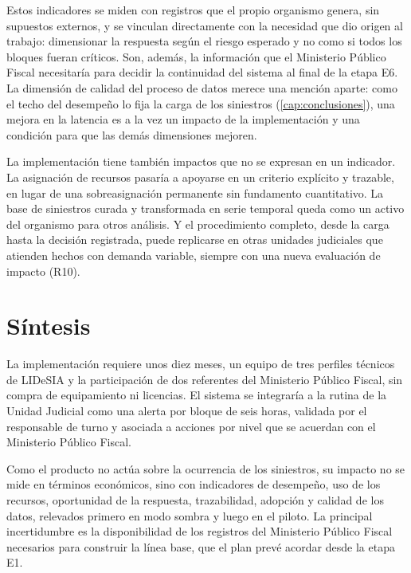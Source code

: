 Estos indicadores se miden con registros que el propio organismo genera, sin supuestos
externos, y se vinculan directamente con la necesidad que dio origen al trabajo:
dimensionar la respuesta según el riesgo esperado y no como si todos los bloques fueran
críticos. Son, además, la información que el Ministerio Público Fiscal necesitaría para
decidir la continuidad del sistema al final de la etapa E6. La dimensión de calidad del
proceso de datos merece una mención aparte: como el techo del desempeño lo fija la carga
de los siniestros (\cref{cap:conclusiones}), una mejora en la latencia es a la vez un
impacto de la implementación y una condición para que las demás dimensiones mejoren.

La implementación tiene también impactos que no se expresan en un indicador. La
asignación de recursos pasaría a apoyarse en un criterio explícito y trazable, en lugar
de una sobreasignación permanente sin fundamento cuantitativo. La base de siniestros
curada y transformada en serie temporal queda como un activo del organismo para otros
análisis. Y el procedimiento completo, desde la carga hasta la decisión registrada, puede
replicarse en otras unidades judiciales que atienden hechos con demanda variable,
siempre con una nueva evaluación de impacto (R10).

\section{Síntesis}\label{sec:impl-sintesis}

La implementación requiere unos diez meses, un equipo de tres perfiles técnicos de
LIDeSIA y la participación de dos referentes del Ministerio
Público Fiscal, sin compra de equipamiento ni licencias. El sistema se integraría a la
rutina de la Unidad Judicial como una alerta por bloque de seis horas, validada por el
responsable de turno y asociada a acciones por nivel que se acuerdan con el Ministerio
Público Fiscal.

Como el producto no actúa sobre la ocurrencia de los siniestros, su impacto no se mide
en términos económicos, sino con indicadores de desempeño, uso de los recursos,
oportunidad de la respuesta, trazabilidad, adopción y calidad de los datos, relevados
primero en modo sombra y luego en el piloto. La principal incertidumbre es la
disponibilidad de los registros del Ministerio Público Fiscal necesarios para construir
la línea base, que el plan prevé acordar desde la etapa E1.

